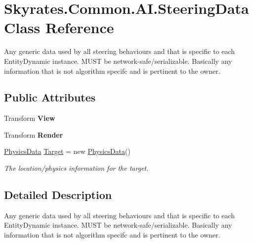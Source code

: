 \hypertarget{class_skyrates_1_1_common_1_1_a_i_1_1_steering_data}{\section{Skyrates.\-Common.\-A\-I.\-Steering\-Data Class Reference}
\label{class_skyrates_1_1_common_1_1_a_i_1_1_steering_data}
}


Any generic data used by all steering behaviours and that is specific to each Entity\-Dynamic instance. M\-U\-S\-T be network-\/safe/serializable. Basically any information that is not algorithm specifc and is pertinent to the owner.  


\subsection*{Public Attributes}
\begin{DoxyCompactItemize}
\item 
\hypertarget{class_skyrates_1_1_common_1_1_a_i_1_1_steering_data_a2511b9a4bc14e39a96c1ba844ce073a5}{Transform {\bfseries View}}\label{class_skyrates_1_1_common_1_1_a_i_1_1_steering_data_a2511b9a4bc14e39a96c1ba844ce073a5}

\item 
\hypertarget{class_skyrates_1_1_common_1_1_a_i_1_1_steering_data_a15c5a7d4c662febfbed073443ae93c35}{Transform {\bfseries Render}}\label{class_skyrates_1_1_common_1_1_a_i_1_1_steering_data_a15c5a7d4c662febfbed073443ae93c35}

\item 
\hyperlink{class_skyrates_1_1_common_1_1_a_i_1_1_physics_data}{Physics\-Data} \hyperlink{class_skyrates_1_1_common_1_1_a_i_1_1_steering_data_af62ca00fa92111adb3380fdaa0ba6a0f}{Target} = new \hyperlink{class_skyrates_1_1_common_1_1_a_i_1_1_physics_data}{Physics\-Data}()
\begin{DoxyCompactList}\small\item\em The location/physics information for the target. \end{DoxyCompactList}\end{DoxyCompactItemize}


\subsection{Detailed Description}
Any generic data used by all steering behaviours and that is specific to each Entity\-Dynamic instance. M\-U\-S\-T be network-\/safe/serializable. Basically any information that is not algorithm specifc and is pertinent to the owner. 




